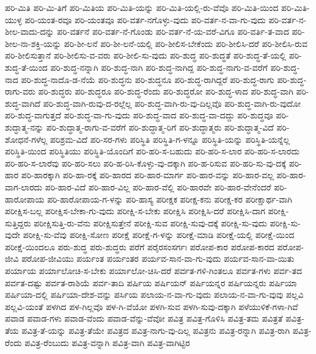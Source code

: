 {ಪರಿ-ಮಿತಿ
ಪರಿ-ಮಿ-ತಿಗೆ
ಪರಿ-ಮಿತಿಯ
ಪರಿ-ಮಿತಿ-ಯನ್ನು
ಪರಿ-ಮಿತಿ-ಯಲ್ಲಿ-ರು-ವೆವೊ
ಪರಿ-ಮಿತಿ-ಯಿಂದ
ಪರಿ-ಮಿತಿ-ಯುಳ್ಳ
ಪರಿ-ಯಂತ-ರವೂ
ಪರಿ-ಯಂತವೂ
ಪರಿ-ವರ್ತ-ನಗೊಳ್ಳು-ವುದು
ಪರಿ-ವರ್ತ-ನ-ವಾ-ಗು-ವುದು
ಪರಿ-ವರ್ತ-ನ-ಶೀಲ-ವಾದು-ದನ್ನು
ಪರಿ-ವರ್ತನೆ
ಪರಿ-ವರ್ತ-ನೆ-ಗೊಂಡು
ಪರಿ-ವರ್ತ-ನೆ-ಯ-ವರೆ-ವಿಗೂ
ಪರಿ-ವರ್ತಿ-ತ-ವಾದ
ಪರಿ-ಶೀಲ-ನಾ-ಶಕ್ತಿ-ಯನ್ನು
ಪರಿ-ಶೀ-ಲನೆ
ಪರಿ-ಶೀ-ಲನೆ-ಯಲ್ಲಿ
ಪರಿ-ಶೀಲಿಸ-ಬೇಕೆಂದು
ಪರಿ-ಶೀಲಿಸಿ-ದರೆ
ಪರಿ-ಶೀಲಿಸಿ-ರುವ
ಪರಿ-ಶೀಲಿಸುತ್ತಾನೆ
ಪರಿ-ಶೀಲಿಸು-ವ-ವರು
ಪರಿ-ಶೀಲಿ-ಸು-ವುದು
ಪರಿ-ಶುದ್ಧ
ಪರಿ-ಶುದ್ಧತೆ
ಪರಿ-ಶುದ್ಧ-ತೆ-ಯಲ್ಲಿ
ಪರಿ-ಶುದ್ಧ-ತೆ-ಯಿಂದ
ಪರಿ-ಶುದ್ಧ-ನನ್ನಾಗಿ
ಪರಿ-ಶುದ್ಧ-ನಾಗಿ
ಪರಿ-ಶುದ್ಧ-ನಾಗಿದ್ದ
ಪರಿ-ಶುದ್ಧ-ನಾಗು-ವ-ವರೆಗೆ
ಪರಿ-ಶುದ್ಧ-ನಾದ
ಪರಿ-ಶುದ್ಧ-ನಾದೊ-ಡ-ನೆಯೆ
ಪರಿ-ಶುದ್ಧನು
ಪರಿ-ಶುದ್ಧನೂ
ಪರಿ-ಶುದ್ಧ-ರಾಗಿದ್ದರೆ
ಪರಿ-ಶುದ್ಧ-ರಾಗು
ಪರಿ-ಶುದ್ಧ-ರಾಗು-ವರು
ಪರಿ-ಶುದ್ಧರು
ಪರಿ-ಶುದ್ಧರೂ
ಪರಿ-ಶುದ್ಧ-ರೆಂದು
ಪರಿ-ಶುದ್ಧರೋ
ಪರಿ-ಶುದ್ಧ-ಳಾದ
ಪರಿ-ಶುದ್ಧ-ವಾಗಿ
ಪರಿ-ಶುದ್ಧ-ವಾಗಿದೆ
ಪರಿ-ಶುದ್ಧ-ವಾಗಿ-ರುವು-ದ-ರಲ್ಲೆಲ್ಲ
ಪರಿ-ಶುದ್ಧ-ವಾಗಿ-ರು-ವು-ದಿಲ್ಲವೊ
ಪರಿ-ಶುದ್ಧ-ವಾಗಿ-ರು-ವುದೋ
ಪರಿ-ಶುದ್ಧ-ವಾಗುತ್ತದೆ
ಪರಿ-ಶುದ್ಧ-ವಾ-ಗು-ವುದು
ಪರಿ-ಶುದ್ಧ-ವಾದ
ಪರಿ-ಶುದ್ಧ-ವಾ-ದದ್ದು
ಪರಿ-ಶುದ್ಧವೂ
ಪರಿ-ಶುದ್ಧಾತ್ಮ-ನನ್ನು
ಪರಿ-ಶುದ್ಧಾತ್ಮ-ರಾಗು-ವ-ವರೆಗೆ
ಪರಿ-ಶುದ್ಧಾತ್ಮ-ರಿಗೆ
ಪರಿ-ಶುದ್ಧಾತ್ಮರು
ಪರಿ-ಶುದ್ಧಾತ್ಮ-ವಿದೆ
ಪರಿ-ಶೋಧನೆ-ಗಳೆಲ್ಲ
ಪರಿಶ್ರಮ-ವಿದೆ
ಪರಿ-ಸರ-ಗಳು
ಪರಿಸ್ಥಿತಿ
ಪರಿಸ್ಥಿತಿ-ಗ-ಳನ್ನೂ
ಪರಿಸ್ಥಿತಿ-ಯನ್ನು
ಪರಿಸ್ಥಿತಿ-ಯನ್ನೆಲ್ಲ
ಪರಿಸ್ಥಿತಿ-ಯಿಂದ
ಪರಿಸ್ಥಿತಿಯು
ಪರಿಸ್ಥಿತಿ-ಯೊಂದಿಗೆ
ಪರಿ-ಹರಿ-ಸ-ಬಹುದು
ಪರಿ-ಹರಿ-ಸ-ಲಾರ
ಪರಿ-ಹರಿ-ಸ-ಲಾರದು
ಪರಿ-ಹರಿ-ಸ-ಲಾರೆವು
ಪರಿ-ಹರಿ-ಸಲು
ಪರಿ-ಹ-ರಿಸಿ-ಕೊಳ್ಳು-ವು-ದಕ್ಕಾಗಿ
ಪರಿ-ಹ-ರಿಸುವ
ಪರಿ-ಹರಿ-ಸು-ವು-ದಕ್ಕೆ
ಪರಿ-ಹಾರ
ಪರಿ-ಹಾರಕ್ಕಾಗಿ
ಪರಿ-ಹಾ-ರಕ್ಕೆ
ಪರಿ-ಹಾರದ
ಪರಿ-ಹಾರ-ಮಾರ್ಗ
ಪರಿ-ಹಾರ-ವನ್ನು
ಪರಿ-ಹಾರ-ವಲ್ಲ
ಪರಿ-ಹಾರ-ವಾಗ-ಲಾರದು
ಪರಿ-ಹಾರ-ವಿದೆ
ಪರಿ-ಹಾರ-ವಿಲ್ಲ
ಪರಿ-ಹಾರ-ವೆಲ್ಲಿ
ಪರಿ-ಹಾರವೇ
ಪರಿ-ಹಾರ-ವೇನೆಂದರೆ
ಪರಿ-ಹಾರೋಪಾಯ
ಪರಿ-ಹಾರೋಪಾಯ-ಗ-ಳನ್ನು
ಪರಿ-ಹಾಸ್ಯ
ಪರೀಕ್ಷಕ
ಪರೀಕ್ಷ-ಕನು
ಪರೀಕ್ಷ-ಕರ
ಪರೀಕ್ಷಾರ್ಥ-ವಾಗಿ
ಪರೀಕ್ಷಿಸ-ಬಲ್ಲ
ಪರೀಕ್ಷಿಸ-ಬೇಕಾ-ಗು-ವುದು
ಪರೀಕ್ಷಿ-ಸ-ಬೇಕು
ಪರೀಕ್ಷಿಸಿ
ಪರೀಕ್ಷಿಸಿ-ದರೆ
ಪರೀಕ್ಷಿಸಿ-ದಾಗ
ಪರೀಕ್ಷಿ-ಸುತ್ತಿದ್ದರು
ಪರೀಕ್ಷಿಸುತ್ತಿ-ರು-ವೆನು
ಪರೀಕ್ಷಿಸುತ್ತೇನೆ
ಪರೀಕ್ಷಿ-ಸುವ
ಪರೀಕ್ಷಿ-ಸುವು-ದಕ್ಕೆ
ಪರೀಕ್ಷಿ-ಸು-ವುದು
ಪರೀಕ್ಷಿ-ಸು-ವುದೇ
ಪರೀಕ್ಷಿ-ಸು-ವೆವು
ಪರೀಕ್ಷಿ-ಸೋಣ
ಪರೀಕ್ಷೆ
ಪರೀಕ್ಷೆ-ಗ-ಳನ್ನು
ಪರೀಕ್ಷೆ-ಮಾಡಿ
ಪರೀಕ್ಷೆ-ಯಲ್ಲಿ
ಪರೀಕ್ಷೆ-ಯಿಂದ
ಪರೀಕ್ಷೆ-ಯಿಂದಲೂ
ಪರು-ಶುದ್ಧ
ಪರು-ಶುದ್ಧರು
ಪರೆಗೆ
ಪರೈರಸಂಸರ್ಗಃ
ಪರೋಪ-ಕಾರ
ಪರೋಪ-ಕಾರದ
ಪರೋಪ-ಜೀವಿ
ಪರೋಪ-ಜೀವಿಯು
ಪರ್ಯಂತ
ಪರ್ಯಂತರ
ಪರ್ಯವ-ಸಾನ-ವಾ-ಗು-ವುದು
ಪರ್ಯವ-ಸಾನ-ವಾ-ಯಿತು
ಪರ್ಯಾಯ
ಪರ್ಯಾಲೋಚಿ-ಸ-ಬೇಕು
ಪರ್ಯಾಲೋ-ಚಿಸಿ-ದರೆ
ಪರ್ವತ-ಗಳಿ-ಗಿಂತಲೂ
ಪರ್ವತ-ಗಳು
ಪರ್ವ-ತದ
ಪರ್ವತ-ದಷ್ಟು
ಪರ್ವತ-ರಾಶಿಯೆ
ಪರ್ವ-ತಾದಿ
ಪರ್ಷಿಯ
ಪರ್ಷಿಯನ್
ಪರ್ಷಿಯನ್ನರ
ಪರ್ಷಿಯನ್ನರು
ಪರ್ಷಿಯಾ
ಪರ್ಷಿಯಾ-ದಲ್ಲಿ
ಪರ್ಷಿಯಾ-ದೇಶ-ವನ್ನು
ಪರ್ಸಿಯ
ಪಲಾಯ-ನ-ವಾ-ಗು-ವುದು
ಪಲಾಯ-ನ-ವಾ-ಗು-ವುವು
ಪಲ್ಲವಿ
ಪಲ್ಲವಿ-ಯಂತೆ
ಪಳಗಿದ
ಪಳ-ಗಿಲ್ಲವೊ
ಪಳ-ಗಿ-ವೆಯೋ
ಪಳಗಿ-ಸುವ
ಪಳಗಿ-ಸುವು-ದಕ್ಕಾಗಿ
ಪಳೆಯುಳಿಕೆ-ಗಳಾ-ಗಿವೆ
ಪವಾಡ
ಪವಾಡ-ಗಳು
ಪವಾಡ-ವೆಂದು
ಪವಾಡ-ವೆನ್ನು-ವೆವೋ
ಪವಿತ್ರ
ಪವಿತ್ರ-ಗೊಳಿಸಿ
ಪವಿತ್ರ-ತಮ
ಪವಿತ್ರತೆ
ಪವಿತ್ರ-ತೆಯ
ಪವಿತ್ರ-ತೆ-ಯನ್ನು
ಪವಿತ್ರ-ತೆಯೇ
ಪವಿತ್ರದ
ಪವಿತ್ರ-ನಾಗು-ವು-ದಿಲ್ಲ
ಪವಿತ್ರನು
ಪವಿತ್ರ-ರನ್ನಾಗಿ
ಪವಿತ್ರ-ರಾಗಿ
ಪವಿತ್ರ-ರೆಂದು
ಪವಿತ್ರ-ರೆಂಬುದು
ಪವಿತ್ರ-ವನ್ನಾಗಿ
ಪವಿತ್ರ-ವಾಗಿ
ಪವಿತ್ರ-ವಾಗಿಟ್ಟಿರ
}
